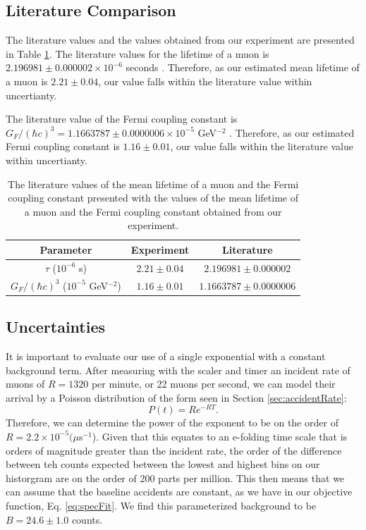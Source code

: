 \documentclass[
    aps, 
    twocolumn, 
    secnumarabic, 
    balancelastpage, 
    amsmath, 
    amssymb, 
    nofootinbib, 
    floatfix
]{revtex4-2}
\begin{document}
\subsection{Literature Comparison}

The literature values and the values obtained from our experiment are presented in Table \ref{tbl:lit}. The literature values for the lifetime of a muon is $2.196981 \pm 0.000002 \times 10^{-6}$ seconds \cite{olive2014}. Therefore, as our estimated mean lifetime of a muon is $2.21 \pm 0.04$, our value falls within the literature value within uncertianty.

The literature value of the Fermi coupling constant is $G_F/(\hbar c)^{3} =  1.1663787 \pm 0.000 0006 \times 10^{-5}$ GeV$^{-2}$ \cite{nistFermi}. Therefore, as our estimated Fermi coupling constant is $1.16 \pm 0.01$, our value falls within the literature value within uncertianty.

\begin{table}[t]
	\begin{tabular}{c|cc}
		\textbf{Parameter} & \textbf{Experiment} & \textbf{Literature} \\
      		\hline
		$\tau$ ($10^{-6}$ s)          & $2.21 \pm 0.04$ & $2.196981 \pm 0.000002$\\
		$G_F/(\hbar c)^3$ ($10^{-5}$ GeV$^{-2}$) & $1.16 \pm 0.01$ & $1.1663787 \pm 0.000 0006$ \\
	\end{tabular}
	\caption{\label{tbl:lit} The literature values of the mean lifetime of a muon and the Fermi coupling constant presented with the values of the mean lifetime of a muon and the Fermi coupling constant obtained from our experiment.}
\end{table}

\subsection{Uncertainties}

It is important to evaluate our use of a single exponential with a constant background term. After measuring with the scaler and timer an incident rate of muons of $R = 1320$ per minute, or 22 muons per second, we can model their arrival by a Poisson distribution of the form seen in Section \ref{sec:accidentRate}:
\begin{equation}
	P(t) = Re^{-RT}.
\end{equation}
Therefore, we can determine the power of the exponent to be on the order of $R = 2.2 \times 10^{-5} (\mu$s$^{-1}$). Given that this equates to an e-folding time scale that is orders of magnitude greater than the incident rate, the order of the difference between teh counts expected between the lowest and highest bins on our historgram are on the order of 200 parts per million. This then means that we can assume that the baseline accidents are constant, as we have in our objective function, Eq. \eqref{eq:specFit}. We find this parameterized background to be $B = 24.6 \pm 1.0$ counts. 
\end{document}
